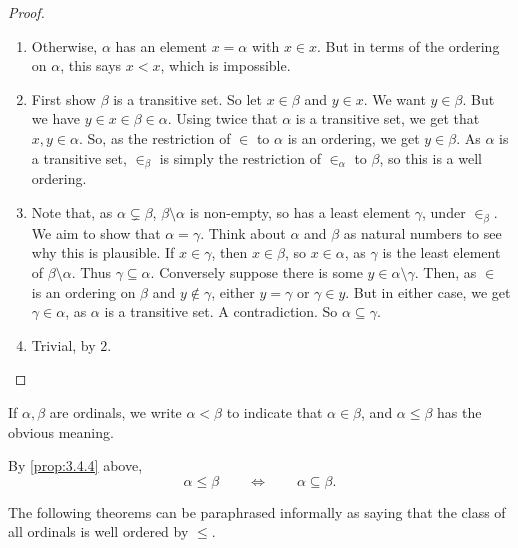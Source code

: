 \begin{proof}
\hfill
\begin{enumerate}
\item Otherwise, $ \alpha $ has an element $ x = \alpha $ with $ x \in x $. But in terms of the ordering on $ \alpha $, this says $ x < x $, which is impossible.
\item First show $ \beta $ is a transitive set. So let $ x \in \beta $ and $ y \in x $. We want $ y \in \beta $. But we have $ y \in x \in \beta \in \alpha $. Using twice that $ \alpha $ is a transitive set, we get that $ x, y \in \alpha $. So, as the restriction of $ \in $ to $ \alpha $ is an ordering, we get $ y \in \beta $. As $ \alpha $ is a transitive set, $ \in_\beta $ is simply the restriction of $ \in_\alpha $ to $ \beta $, so this is a well ordering.
\item Note that, as $ \alpha \subsetneq \beta $, $ \beta \setminus \alpha $ is non-empty, so has a least element $ \gamma $, under $ \in_\beta $. We aim to show that $ \alpha = \gamma $. Think about $ \alpha $ and $ \beta $ as natural numbers to see why this is plausible. If $ x \in \gamma $, then $ x \in \beta $, so $ x \in \alpha $, as $ \gamma $ is the least element of $ \beta \setminus \alpha $. Thus $ \gamma \subseteq \alpha $. Conversely suppose there is some $ y \in \alpha \setminus \gamma $. Then, as $ \in $ is an ordering on $ \beta $ and $ y \notin \gamma $, either $ y = \gamma $ or $ \gamma \in y $. But in either case, we get $ \gamma \in \alpha $, as $ \alpha $ is a transitive set. A contradiction. So $ \alpha \subseteq \gamma $.
\item Trivial, by $ 2 $.
\end{enumerate}
\end{proof}

\pagebreak

\begin{definition}
If $ \alpha, \beta $ are ordinals, we write $ \alpha < \beta $ to indicate that $ \alpha \in \beta $, and $ \alpha \le \beta $ has the obvious meaning.
\end{definition}

\begin{note*}
By \ref{prop:3.4.4} above,
$$ \alpha \le \beta \qquad \iff \qquad \alpha \subseteq \beta. $$
\end{note*}

The following theorems can be paraphrased informally as saying that the class of all ordinals is well ordered by $ \le $.

